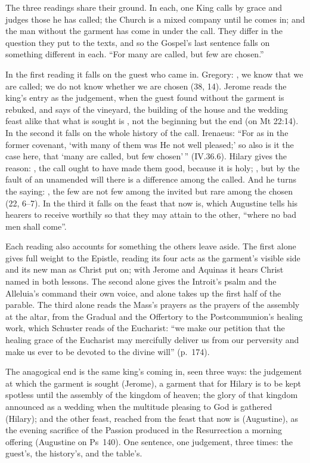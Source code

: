 The three readings share their ground. In each, one King calls by grace and
judges those he has called; the Church is a mixed company until he comes in; and
the man without the garment has come in under the call. They differ in the
question they put to the texts, and so the Gospel's last sentence falls on
something different in each. ``For many are called, but few are chosen.''

In the first reading it falls on the guest who came in. Gregory: , we know that we are called; we
do not know whether we are chosen (38, 14). Jerome reads the king's entry as the
judgement, when the guest found  without the
garment is rebuked, and says of the vineyard, the building of the house and the
wedding feast alike that what is sought is , not
the beginning but the end (on Mt 22:14). In the second it falls on the whole
history of the call. Irenaeus: ``For as in the former covenant, `with many of
them was He not well pleased;' so also is it the case here, that `many are
called, but few chosen'\,'' (IV.36.6). Hilary gives the reason:
, the call ought
to have made them good, because it is holy; , but by the fault of an unamended will there
is a difference among the called. And he turns the saying: , the few are not few among the
invited but rare among the chosen (22, 6--7). In the third it falls on the feast
that now is, which Augustine tells his hearers to receive worthily so that they
may attain to the other, ``where no bad men shall come''.

Each reading also accounts for something the others leave aside. The first
alone gives full weight to the Epistle, reading its four acts as the garment's
visible side and its new man as Christ put on; with Jerome and Aquinas it hears
Christ named in both lessons. The second alone gives the Introit's psalm and the
Alleluia's command their own voice, and alone takes up the first half of the
parable. The third alone reads the Mass's prayers as the prayers of the
assembly at the altar, from the Gradual and the Offertory to the
Postcommunion's healing work, which Schuster reads of the Eucharist: ``we make our petition that the healing grace
of the Eucharist may mercifully deliver us from our perversity and make us ever
to be devoted to the divine will'' (p.~174).

The anagogical end is the same king's coming in, seen three ways: the judgement
at which the garment is sought (Jerome), a garment that for Hilary is to be kept
spotless until the assembly of the kingdom of heaven; the glory of that kingdom
announced as a wedding when the multitude pleasing to God is gathered (Hilary);
and the other feast, reached from the feast that now is (Augustine), as the
evening sacrifice of the Passion produced in the Resurrection a morning offering
(Augustine on Ps~140). One sentence, one judgement, three times: the guest's,
the history's, and the table's.
